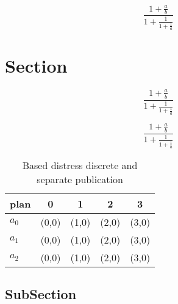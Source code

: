 \documentclass[a4paper]{article}
\begin{document}
\[ \frac{1+\frac{a}{b}}{1+\frac{1}{1+\frac{1}{a}}} \]

\section{Section}

\[ \frac{1+\frac{a}{b}}{1+\frac{1}{1+\frac{1}{a}}} \]

\[ \frac{1+\frac{a}{b}}{1+\frac{1}{1+\frac{1}{a}}} \]

\begin{table}
\begin{adjustbox}{width=0.6\columnwidth}
\begin{tabular}{|l|l|l|l|l|}
\hline
\textbf{plan} & \multicolumn{1}{c|}{\textbf{0}} & \multicolumn{1}{c|}{\textbf{1}} & \multicolumn{1}{c|}{\textbf{2}} & \multicolumn{1}{c|}{\textbf{3}} \\ \hline
\textbf{$a_0$}  & (0,0) & (1,0) & (2,0) & (3,0) \\ \hline
\textbf{$a_1$}  & (0,0) & (1,0) & (2,0) & (3,0) \\ \hline
\textbf{$a_2$}  & (0,0) & (1,0) & (2,0) & (3,0) \\ \hline
\end{tabular}
\end{adjustbox}
\caption{Based distress discrete and separate publication 
}
\end{table}

\subsection{SubSection}
\end{document}
